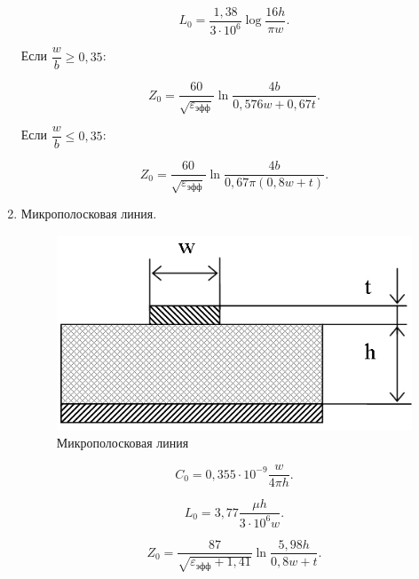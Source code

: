 \documentclass[unicode, 12pt, a4paper, oneside]{article}
\begin{document}
\begin{enumerate}
\begin{minipage}{\linewidth}
	\begin{equation}
	L_0 = \dfrac{1,38}{3 \cdot 10^6} \log \dfrac{16 h}{\pi w}.
	\end{equation}
	
	Если $ \dfrac{w}{b} \geq 0,35 $:
	
	\begin{equation}
	Z_0 = \dfrac{60}{\sqrt{\varepsilon_\text{эфф}}} \ln \dfrac{4b}{0,576w + 0,67t}.
	\end{equation}
	
	Если $ \dfrac{w}{b} \leq 0,35 $:
	
	\begin{equation}
	Z_0 = \dfrac{60}{\sqrt{\varepsilon_\text{эфф}}} \ln \dfrac{4b}{0,67\pi (0,8w + t)}.
	\end{equation}
\end{minipage}
\vspace{1em}

\item Микрополосковая линия.\nopagebreak

\begin{minipage}{\linewidth}
	\begin{figure}
	\centering
	\includegraphics[width=0.9\linewidth]{71_micropolos_line.png}
	\caption{Микрополосковая линия}
	\end{figure}
	
	\begin{equation}
	C_0 = 0,355 \cdot 10^{-9} \dfrac{w}{4\pi h}.
	\end{equation}

	\begin{equation}
	L_0 = 3,77 \dfrac{\mu h}{3 \cdot 10^6 w}.
	\end{equation}
	
	\begin{equation}
	Z_0 = \dfrac{87}{\sqrt{\varepsilon_\text{эфф} + 1,41}} \ln \dfrac{5,98 h}{0,8w + t}.
	\end{equation}
\end{minipage}
\vspace{1em}


\end{enumerate}
\end{document}
